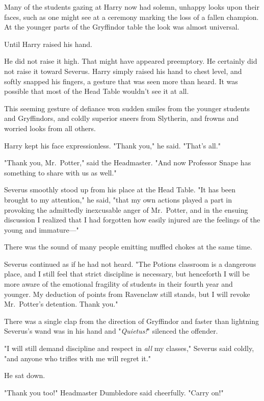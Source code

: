 Many of the students gazing at Harry now had solemn, unhappy looks upon their
faces, such as one might see at a ceremony marking the loss of a fallen
champion. At the younger parts of the Gryffindor table the look was almost
universal.

Until Harry raised his hand.

He did not raise it high. That might have appeared preemptory. He certainly did
not raise it toward Severus. Harry simply raised his hand to chest level, and
softly snapped his fingers, a gesture that was seen more than heard. It was
possible that most of the Head Table wouldn't see it at all.

This seeming gesture of defiance won sudden smiles from the younger students
and Gryffindors, and coldly superior sneers from Slytherin, and frowns and
worried looks from all others.

Harry kept his face expressionless. "Thank you," he said. "That's all."

"Thank you, Mr.~Potter," said the Headmaster. "And now Professor Snape has
something to share with us as well."

Severus smoothly stood up from his place at the Head Table. "It has been
brought to my attention," he said, "that my own actions played a part in
provoking the admittedly inexcusable anger of Mr.~Potter, and in the ensuing
discussion I realized that I had forgotten how easily injured are the feelings
of the young and immature\mbox{---}"

There was the sound of many people emitting muffled chokes at the same time.

Severus continued as if he had not heard. "The Potions classroom is a dangerous
place, and I still feel that strict discipline is necessary, but henceforth I
will be more aware of the{\el} emotional fragility{\el} of students in
their fourth year and younger. My deduction of points from Ravenclaw still
stands, but I will revoke Mr.~Potter's detention. Thank you."

There was a single clap from the direction of Gryffindor and faster than
lightning Severus's wand was in his hand and "\emph{Quietus!}" silenced the
offender.

"I will still demand discipline and respect in \emph{all} my classes," Severus
said coldly, "and anyone who trifles with me will regret it."

He sat down.

"Thank you too!" Headmaster Dumbledore said cheerfully. "Carry on!"

